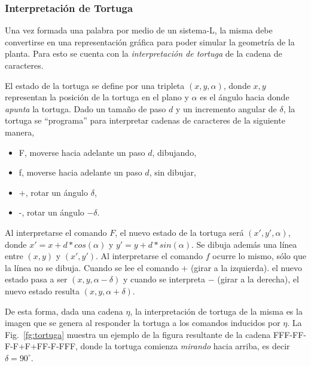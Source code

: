 \subsubsection{Interpretación de Tortuga}
Una vez formada una palabra por medio de un sistema-L, la misma debe convertirse en una representación gráfica para poder simular la geometría de la planta.
Para esto se cuenta con la {\em interpretación de tortuga} de la cadena de caracteres.

El estado de la tortuga se define por una tripleta $(x,y,\alpha)$, donde $x,y$ representan la posición de la tortuga en el plano y $\alpha$ es el ángulo hacia donde {\em apunta} la tortuga.
Dado un tamaño de paso $d$ y un incremento angular de $\delta$, la tortuga se ``programa'' para interpretar cadenas de caracteres de la siguiente manera,

\begin{itemize}
\item F, moverse hacia adelante un paso $d$, dibujando,
\item f, moverse hacia adelante un paso $d$, sin dibujar,
\item +, rotar un ángulo $\delta$,
\item -, rotar un ángulo $-\delta$.
\end{itemize}

Al interpretarse el comando $F$, el nuevo estado de la tortuga será $(x',y',\alpha)$, donde $x' = x + d * cos(\alpha)$ y $y' = y + d * sin(\alpha)$. Se dibuja además una línea entre $(x,y)$ y $(x',y')$.
Al interpretarse el comando $f$ ocurre lo mismo, sólo que la línea no se dibuja.
Cuando se lee el comando $+$ (girar a la izquierda). el nuevo estado pasa a ser $(x,y,\alpha-\delta)$ y cuando se interpreta $-$ (girar a la derecha), el nuevo estado resulta $(x,y,\alpha+\delta)$.

De esta forma, dada una cadena $\eta$, la interpretación de tortuga de la misma es la imagen que se genera al responder la tortuga a los comandos inducidos por $\eta$.
La Fig.~\ref{fg:tortuga} muestra un ejemplo de la figura resultante de la cadena FFF-FF-F-F+F+FF-F-FFF, donde la tortuga comienza {\em mirando} hacia arriba, es decir $\delta = 90^{\circ}$.

